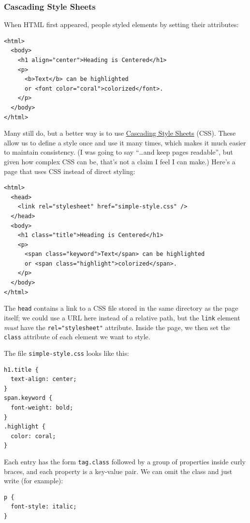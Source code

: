 \subsubsection{Cascading Style Sheets}\label{s:htmlcss-css}

When HTML first appeared, people styled elements by setting their
attributes:

\begin{verbatim}
<html>
  <body>
    <h1 align="center">Heading is Centered</h1>
    <p>
      <b>Text</b> can be highlighted
      or <font color="coral">colorized</font>.
    </p>
  </body>
</html>
\end{verbatim}

Many still do, but a better way is to use
\protect\hyperlink{g:css}{Cascading Style Sheets} (CSS). These allow us
to define a style once and use it many times, which makes it much easier
to maintain consistency. (I was going to say ``\ldots{}and keep pages
readable'', but given how complex CSS can be, that's not a claim I feel
I can make.) Here's a page that uses CSS instead of direct styling:

\begin{verbatim}
<html>
  <head>
    <link rel="stylesheet" href="simple-style.css" />
  </head>
  <body>
    <h1 class="title">Heading is Centered</h1>
    <p>
      <span class="keyword">Text</span> can be highlighted
      or <span class="highlight">colorized</span>.
    </p>
  </body>
</html>
\end{verbatim}

The \texttt{head} contains a link to a CSS file stored in the same
directory as the page itself; we could use a URL here instead of a
relative path, but the \texttt{link} element \emph{must} have the
\texttt{rel="stylesheet"} attribute. Inside the page, we then set the
\texttt{class} attribute of each element we want to style.

The file \texttt{simple-style.css} looks like this:

\begin{verbatim}
h1.title {
  text-align: center;
}
span.keyword {
  font-weight: bold;
}
.highlight {
  color: coral;
}
\end{verbatim}

Each entry has the form \texttt{tag.class} followed by a group of
properties inside curly braces, and each property is a key-value pair.
We can omit the class and just write (for example):

\begin{verbatim}
p {
  font-style: italic;
}
\end{verbatim}

